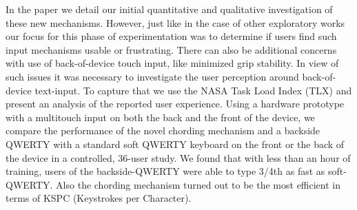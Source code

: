 In the paper we detail our initial quantitative and qualitative investigation of these new mechanisms. However, just like in the case of other exploratory works \cite{RearType} our focus for this phase of experimentation was to determine if users find such input mechanisms usable or frustrating. There can also be additional concerns with use of back-of-device touch input, like minimized grip stability. In view of such issues it was necessary to investigate the user perception around back-of-device text-input. To capture that we use the NASA Task Load Index (TLX) and present an analysis of the reported user experience. Using a hardware prototype with a multitouch input on both the back and the front of the device, we compare the performance of the novel chording mechanism and a backside QWERTY with a standard soft QWERTY keyboard on the front or the back of the device in a controlled, 36-user study. We found that with less than an hour of training, users of the backside-QWERTY were able to type 3/4th as fast as soft-QWERTY. Also the chording mechanism turned out to be the most efficient in terms of KSPC (Keystrokes per Character).